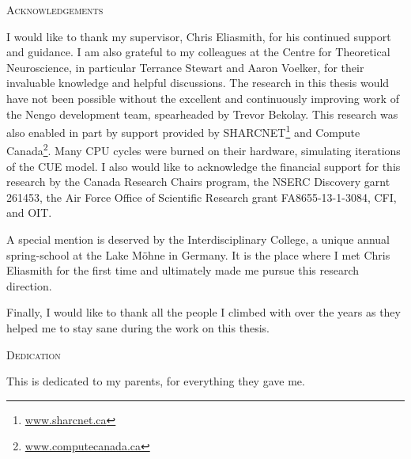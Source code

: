 \begin{center}\textsc{Acknowledgements}\end{center}
I would like to thank my supervisor, Chris Eliasmith, for his continued support and guidance.
I am also grateful to my colleagues at the Centre for Theoretical Neuroscience, in particular Terrance Stewart and Aaron Voelker, for their invaluable knowledge and helpful discussions.
The research in this thesis would have not been possible without the excellent and continuously improving work of the Nengo development team, spearheaded by Trevor Bekolay.
This research was also enabled in part by support provided by SHARCNET\footnote{\href{https://www.sharcnet.ca}{www.sharcnet.ca}} and Compute Canada\footnote{\href{https://www.computecanada.ca}{www.computecanada.ca}}.
Many CPU cycles were burned on their hardware, simulating iterations of the CUE model.
I also would like to acknowledge the financial support for this research by the Canada Research Chairs program, the NSERC Discovery garnt 261453, the Air Force Office of Scientific Research grant FA8655-13-1-3084, CFI, and OIT\@.  %

A special mention is deserved by the Interdisciplinary College, a unique annual spring-school at the Lake Möhne in Germany.
It is the place where I met Chris Eliasmith for the first time and ultimately made me pursue this research direction.

Finally, I would like to thank all the people I climbed with over the years as they helped me to stay sane during the work on this thesis.


\cleardoublepage


\begin{center}\textsc{Dedication}\end{center}

This is dedicated to my parents, for everything they gave me.

\cleardoublepage

\renewcommand\contentsname{Table of Contents}
\tableofcontents
\cleardoublepage

\listoftables
\cleardoublepage

\listoffigures
\cleardoublepage

\printglossaries
\cleardoublepage

\pagestyle{headings}
